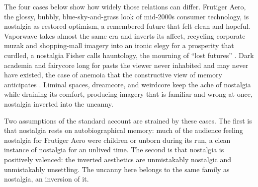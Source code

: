 \documentclass[11pt]{article}
\begin{document}
The four cases below show how widely those relations can differ. Frutiger Aero, the glossy,
bubbly, blue-sky-and-grass look of mid-2000s consumer technology, is nostalgia as restored
optimism, a remembered future that felt clean and hopeful. Vaporwave takes almost the same era and inverts its affect, recycling
corporate muzak and shopping-mall imagery into an ironic elegy for a prosperity that curdled, a
nostalgia Fisher calls hauntology, the mourning of ``lost futures'' \citep{fisher2014}.
Dark academia and fairycore long for pasts the viewer never inhabited and may never
have existed, the case of anemoia that the constructive view of memory anticipates
\citep{debrigard2014}. Liminal spaces, dreamcore, and weirdcore keep the ache
of nostalgia while draining its comfort, producing imagery that is familiar and wrong at once,
nostalgia inverted into the uncanny.

Two assumptions of the standard account are strained by these cases. The first is that nostalgia
rests on autobiographical memory: much of the audience feeling nostalgia for Frutiger Aero
were children or unborn during its run, a clean instance of nostalgia for an unlived time. The
second is that nostalgia is positively valenced: the inverted aesthetics are unmistakably
nostalgic and unmistakably unsettling. The uncanny here belongs to the same family as nostalgia,
an inversion of it.
\end{document}

